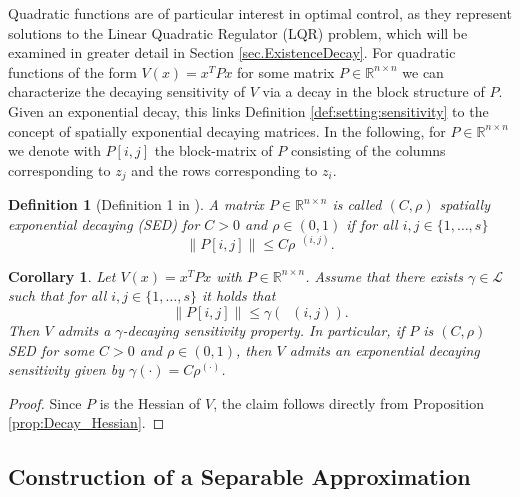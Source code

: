 \documentclass{article}
\newcommand{\R}{\mathbb{R}}
\newcommand{\Rnn}{\R^{n \times n}}
\renewcommand{\L}{\mathcal{L}}
\DeclareMathOperator{\distG}{\operatorname{dist_\mathcal{G}}} %
\newcommand{\agents}{\lbrace 1, \dots, s \rbrace}
\newcommand{\norm}[1]{\left\lVert {#1} \right\rVert}
\newtheorem{corollary}[lemma]{Corollary}
\newtheorem{definition}{Definition}[section]
\begin{document}
Quadratic functions are of particular interest in optimal control, as they represent solutions to the Linear Quadratic Regulator (LQR) problem, which will be examined in greater detail in Section \ref{sec.ExistenceDecay}. For quadratic functions of the form $V(x) = x^T P x$ for some matrix $P \in \Rnn$ we can characterize the decaying sensitivity of $V$ via a decay in the block structure of $P$. Given an exponential decay, this links Definition \ref{def:setting:sensitivity} to the concept of spatially exponential decaying matrices. In the following, for $P \in \Rnn$ we denote with $P[i,j]$ the block-matrix of $P$ consisting of the columns corresponding to $z_j$ and the rows corresponding to $z_i$.

\begin{definition}[Definition 1 in \cite{zhang2023optimal}]
       A matrix $P \in \Rnn$ is called $(C,\rho)$ spatially exponential decaying (SED) for $C > 0$ and $\rho \in (0,1)$ if for all $i,j \in \agents$  
    \begin{equation*}
        \norm{P[i,j]} \leq C \rho^{\distG(i,j)}.
    \end{equation*} 
\end{definition}

\begin{corollary}
\label{cor:decay_P}
    Let $V(x) = x^T P x$ with $P \in \Rnn$. Assume that there exists $\gamma \in \L$ such that for all $i,j \in \agents$ it holds that 
    \begin{equation}
        \norm{P[i,j]} \leq \gamma(\distG(i,j)). 
    \end{equation}
    Then $V$ admits a $\gamma$-decaying sensitivity property. In particular, if $P$ is $(C, \rho)$ SED for some $C >0$ and $\rho \in (0,1)$, then $V$ admits an exponential decaying sensitivity given by $\gamma(\cdot) = C \rho^{(\cdot)}$. 
\end{corollary}

\begin{proof}
    Since $P$ is the Hessian of $V$, the claim follows directly from Proposition \ref{prop:Decay_Hessian}. 
\end{proof}  

\subsection{Construction of a Separable Approximation}
\label{sec:construction}
\end{document}
